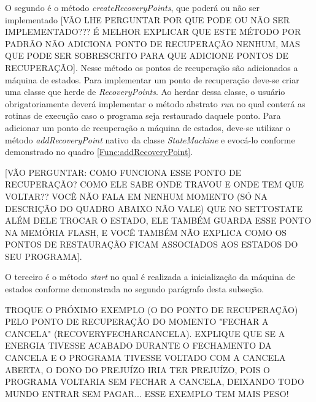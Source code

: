 O segundo é o método \textit{createRecoveryPoints}, que poderá ou não ser implementado [VÃO LHE PERGUNTAR POR QUE PODE OU NÃO SER IMPLEMENTADO??? É MELHOR EXPLICAR QUE ESTE MÉTODO POR PADRÃO NÃO ADICIONA PONTO DE RECUPERAÇÃO NENHUM, MAS QUE PODE SER SOBRESCRITO PARA QUE ADICIONE PONTOS DE RECUPERAÇÃO]. Nesse método os pontos de recuperação são adicionados a máquina de estados. Para implementar um ponto de recuperação deve-se criar uma classe que herde de \textit{RecoveryPoints}. Ao herdar dessa classe, o usuário obrigatoriamente deverá implementar o método abstrato \textit{run} no qual conterá as rotinas de execução caso o programa seja restaurado daquele ponto. Para adicionar um ponto de recuperação a máquina de estados, deve-se utilizar o método \textit{addRecoveryPoint} nativo da classe \textit{StateMachine} e evocá-lo conforme demonstrado no quadro \autoref{Func:addRecoveryPoint}.

[VÃO PERGUNTAR: COMO FUNCIONA ESSE PONTO DE RECUPERAÇÃO? COMO ELE SABE ONDE TRAVOU E ONDE TEM QUE VOLTAR?? VOCÊ NÃO FALA EM NENHUM MOMENTO (SÓ NA DESCRIÇÃO DO QUADRO ABAIXO NÃO VALE) QUE NO SETTOSTATE ALÉM DELE TROCAR O ESTADO, ELE TAMBÉM GUARDA ESSE PONTO NA MEMÓRIA FLASH, E VOCÊ TAMBÉM NÃO EXPLICA COMO OS PONTOS DE RESTAURAÇÃO FICAM ASSOCIADOS AOS ESTADOS DO SEU PROGRAMA].

O terceiro é o método \textit{start} no qual é realizada a inicialização da máquina de estados conforme demonstrada no segundo parágrafo desta subseção.

TROQUE O PRÓXIMO EXEMPLO (O DO PONTO DE RECUPERAÇÃO) PELO PONTO DE RECUPERAÇÃO DO MOMENTO "FECHAR A CANCELA" (RECOVERYFECHARCANCELA). EXPLIQUE QUE SE A ENERGIA TIVESSE ACABADO DURANTE O FECHAMENTO DA CANCELA E O PROGRAMA TIVESSE VOLTADO COM A CANCELA ABERTA, O DONO DO PREJUÍZO IRIA TER PREJUÍZO, POIS O PROGRAMA VOLTARIA SEM FECHAR A CANCELA, DEIXANDO TODO MUNDO ENTRAR SEM PAGAR... ESSE EXEMPLO TEM MAIS PESO!

